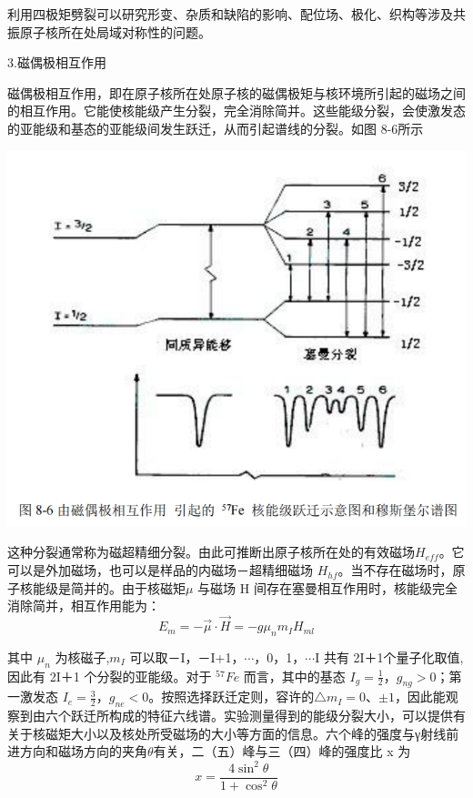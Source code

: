\documentclass[hyperref]{ctexart}
\begin{document}
\begin{multicols}{2}
	利用四极矩劈裂可以研究形变、杂质和缺陷的影响、配位场、极化、织构等涉及共振原子核所在处局域对称性的问题。

	3.磁偶极相互作用
	
	磁偶极相互作用，即在原子核所在处原子核的磁偶极矩与核环境所引起的磁场之间的相互作用。它能使核能级产生分裂，完全消除简并。这些能级分裂，会使激发态的亚能级和基态的亚能级间发生跃迁，从而引起谱线的分裂。如图 8-6所示

	\begin{center}\includegraphics[scale=0.3]{t86.png}\end{center}
	这种分裂通常称为磁超精细分裂。由此可推断出原子核所在处的有效磁场$H_{eff}$。它可以是外加磁场，也可以是样品的内磁场－超精细磁场 $H_{hf}$。当不存在磁场时，原子核能级是简并的。由于核磁矩$\mu$ 与磁场 H 间存在塞曼相互作用时，核能级完全消除简并，相互作用能为：
	\begin{equation}
	E_m=-\vec{\mu}\cdot\vec{H}=-g\mu_nm_IH_{ml}\label{ci}
	\end{equation}

	其中 $\mu_n$ 为核磁子,$m_I$ 可以取－I，－I+1，$\cdots$，0，1，$\cdots$I 共有 2I＋1个量子化取值,因此有 2I＋1 个分裂的亚能级。对于 $^{57}Fe$ 而言，其中的基态 $I_g =\frac{1}{2}$，$g_{ng}>0$；第一激发态 $I_e=\frac{3} {2}$，$g_{ne}<0$。按照选择跃迁定则，容许的$\triangle m_I=0$、$\pm1$，因此能观察到由六个跃迁所构成的特征六线谱。实验测量得到的能级分裂大小，可以提供有关于核磁矩大小以及核处所受磁场的大小等方面的信息。六个峰的强度与γ射线前进方向和磁场方向的夹角$\theta$有关，二（五）峰与三（四）峰的强度比 x 为
	\begin{equation}
	x=\frac{4\sin^2{\theta}}{1+\cos^2{\theta}}
	\end{equation}


\end{multicols}
\end{document}
